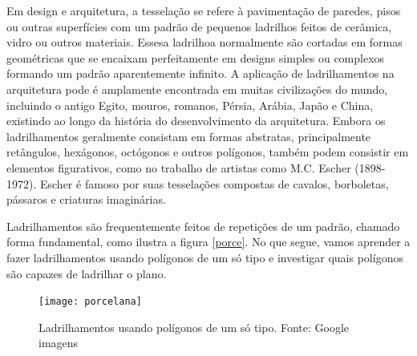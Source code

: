 Em design e arquitetura, a tesselação se refere à pavimentação de paredes, pisos ou outras superfícies com um padrão de pequenos ladrilhos feitos de cerâmica, vidro ou outros materiais. Essesa ladrilhoa normalmente são cortadas em formas geométricas que se encaixam perfeitamente em designs simples ou complexos formando um padrão aparentemente infinito. A aplicação de ladrilhamentos  na arquitetura pode é  amplamente encontrada em muitas civilizações do mundo, incluindo o antigo Egito, mouros, romanos, Pérsia, Arábia, Japão e China, existindo ao longo da história do desenvolvimento da arquitetura. Embora os ladrilhamentos geralmente consistam em formas abstratas, principalmente retângulos, hexágonos, octógonos e outros polígonos, também podem consistir em elementos figurativos, como no trabalho de artistas como M.C. Escher (1898-1972). Escher é famoso por suas tesselações compostas de cavalos, borboletas, pássaros e criaturas imaginárias.



Ladrilhamentos são frequentemente feitos de repetições de um padrão, chamado forma fundamental, como ilustra a figura \ref{porce}. No que segue, vamos aprender a fazer ladrilhamentos usando polígonos de um só tipo e investigar quais polígonos são capazes de ladrilhar o plano.

\begin{figure}[H]
\centering
\texttt{[image: porcelana]}
\caption{Ladrilhamentos usando polígonos de um só tipo. Fonte: Google imagens}
\end{figure}



